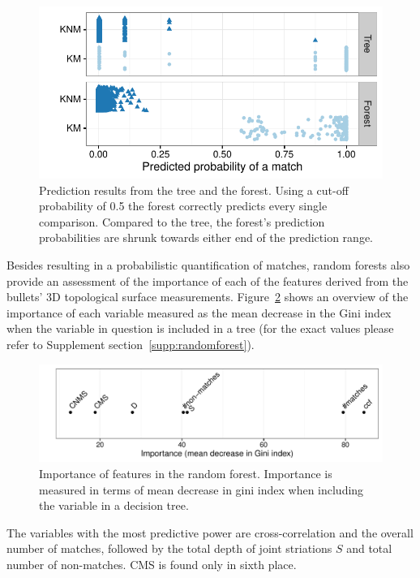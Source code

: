\documentclass[aoas, preprint]{imsart}\usepackage[]{graphicx}\usepackage[]{color}
\newenvironment{knitrout}{}{} %
\begin{document}
\begin{figure}[hbtp]
  \centering
\begin{knitrout}
\color{fgcolor}
\includegraphics[width=.6\textwidth]{treeforest-1} 

\end{knitrout}
\caption{\label{fig:tree-forest}Prediction results from the tree and the forest. Using a cut-off probability of 0.5 the forest correctly predicts every single comparison. Compared to the tree, the forest's prediction probabilities are  shrunk towards either end of the prediction range. }
\end{figure}

Besides resulting in a probabilistic quantification of matches, random forests also provide an assessment of the importance of each of the features derived from the bullets' 3D topological surface measurements. Figure~\ref{fig:importance} shows an overview of the importance of each variable measured as the mean decrease in the Gini index when the variable in question is included in a tree (for the exact values please refer to Supplement section~\ref{supp:randomforest}). 
\begin{figure}
\begin{knitrout}
\color{fgcolor}
\includegraphics[width=.7\textwidth]{unnamed-chunk-1-1} 

\end{knitrout}
\caption{\label{fig:importance}Importance of features in the random forest. Importance is measured in terms of mean decrease in gini index when including the variable in a decision tree.}
\end{figure}


The variables with the most predictive power are cross-correlation and the overall number of matches, followed by the total depth of joint striations $S$ and total number of non-matches. CMS is found only in sixth place.
\end{document}

